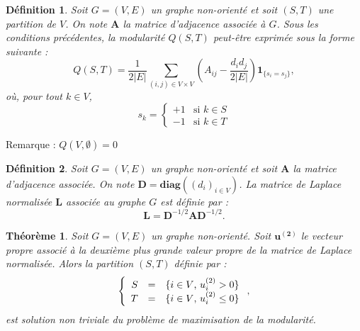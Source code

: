 \documentclass[c]{beamer}
\newtheorem*{deffr}{Définition}
\newtheorem*{theofr}{Théorème}
\begin{document}
\begin{frame}

    \begin{deffr}
        Soit $G = (V, E)$ un graphe non-orienté et soit $(S, T)$ une partition
        de $V$. On note $\mathbf{A}$ la matrice d'adjacence associée à $G$.
        Sous les conditions précédentes, la modularité $Q(S, T)$ peut-être
        exprimée sous la forme suivante :
        \[
            Q(S, T) = \frac{1}{2|E|} \sum_{(i, j) \in V \times V}
                \left( A_{ij} - \frac{d_i d_j}{2|E|} \right)
                \mathbf{1}_{\{s_i = s_j\}},
        \]
        où, pour tout $k \in V$,
        \[
            s_k = \left\{
                \begin{array}{ll}
                    +1 & \text{si $k \in S$} \\
                    -1 & \text{si $k \in T$}
                \end{array}
            \right.
        \]
    \end{deffr}

Remarque : $Q(V, \emptyset) = 0$

\end{frame}

\begin{frame}

    \begin{deffr}
        Soit $G = (V, E)$ un graphe non-orienté et soit $\mathbf{A}$ la matrice
        d'adjacence associée. On note $\mathbf{D} = \mathbf{diag}\left((d_i)_{i \in V}\right)$.
        La matrice de Laplace normalisée $\mathbf{L}$ associée au graphe $G$ est
        définie par :
        \[
            \mathbf{L} = \mathbf{D}^{-1/2} \mathbf{A} \mathbf{D}^{-1/2}.
        \]
    \end{deffr}

    \begin{theofr}
        Soit $G = (V, E)$ un graphe non-orienté. Soit $\mathbf{u^{(2)}}$ le vecteur
        propre associé à la deuxième plus grande valeur propre de la matrice de
        Laplace normalisée. Alors la partition $(S, T)$ définie par :
        \[
            \left\{
                \begin{array}{r c l}
                    S & = & \{ i \in V \text{, } u^{(2)}_i > 0 \} \\
                    T & = & \{ i \in V \text{, } u^{(2)}_i \leq 0 \}
                \end{array}
            \right. ,
        \]
        est solution non triviale du problème de maximisation de la modularité.

    \end{theofr}

\end{frame}
\end{document}
